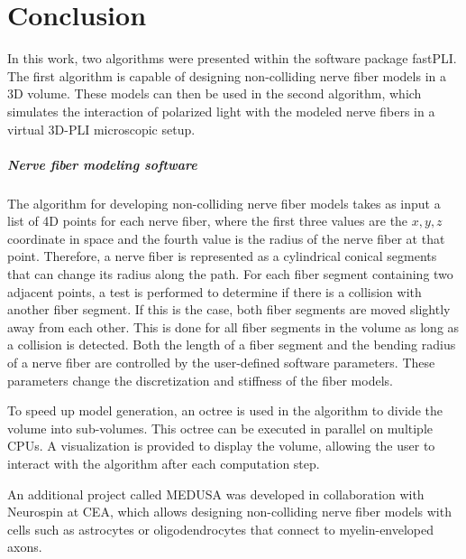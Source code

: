 \cleardoublepage
\setcounter{chapter}{10}
\chapter{Conclusion}
\label{sec:conclusion}
%
In this work, two algorithms were presented within the software package \ac{fastPLI}.
The first algorithm is capable of designing non-colliding nerve fiber models in a 3D volume.
These models can then be used in the second algorithm, which simulates the interaction of polarized light with the modeled nerve fibers in a virtual \ac{3D-PLI} microscopic setup.
%
%
%
\paragraph{Nerve fiber modeling software}
%
The algorithm for developing non-colliding nerve fiber models takes as input a list of 4D points for each nerve fiber, where the first three values are the $x,y,z$ coordinate in space and the fourth value is the radius of the nerve fiber at that point.
Therefore, a nerve fiber is represented as a cylindrical conical segments that can change its radius along the path.
For each fiber segment containing two adjacent points, a test is performed to determine if there is a collision with another fiber segment.
If this is the case, both fiber segments are moved slightly away from each other.
This is done for all fiber segments in the volume as long as a collision is detected.
Both the length of a fiber segment and the bending radius of a nerve fiber are controlled by the user-defined software parameters.
These parameters change the discretization and stiffness of the fiber models.
\par
%
To speed up model generation, an octree is used in the algorithm to divide the volume into sub-volumes.
This octree can be executed in parallel on multiple \acp{CPU}.
A visualization is provided to display the volume, allowing the user to interact with the algorithm after each computation step.
\par
%
An additional project called \ac{MEDUSA} was developed in collaboration with Neurospin at \ac{CEA}, which allows designing non-colliding nerve fiber models with cells such as astrocytes or oligodendrocytes that connect to myelin-enveloped axons.
%
%
%
